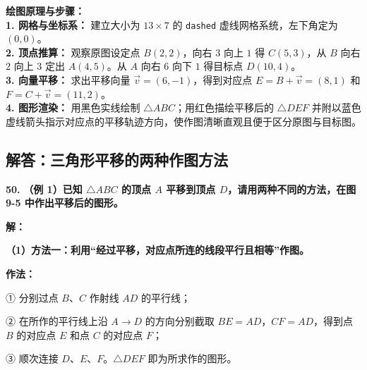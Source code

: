 \vspace{0.4cm}
{\small\color{blue!70!black}
\textbf{绘图原理与步骤：}\\
\textbf{1. 网格与坐标系：} 建立大小为 $13 \times 7$ 的 \texttt{dashed} 虚线网格系统，左下角定为 $(0,0)$。\\
\textbf{2. 顶点推算：} 观察原图设定点 $B(2,2)$，向右 $3$ 向上 $1$ 得 $C(5,3)$，从 $B$ 向右 $2$ 向上 $3$ 定出 $A(4,5)$。从 $A$ 向右 $6$ 向下 $1$ 得目标点 $D(10,4)$。\\
\textbf{3. 向量平移：} 求出平移向量 $\vec{v} = (6, -1)$，得到对应点 $E = B + \vec{v} = (8,1)$ 和 $F = C + \vec{v} = (11,2)$。\\
\textbf{4. 图形渲染：} 用黑色实线绘制 $\triangle ABC$；用红色描绘平移后的 $\triangle DEF$ 并附以蓝色虚线箭头指示对应点的平移轨迹方向，使作图清晰直观且便于区分原图与目标图。
}

\newpage

\newpage

\subsection{解答：三角形平移的两种作图方法}

\vspace{0.6cm}

\textbf{\LARGE 50.} \textbf{（例 1）已知 $\triangle ABC$ 的顶点 $A$ 平移到顶点 $D$，请用两种不同的方法，在图 9-5 中作出平移后的图形。}

\vspace{0.4cm}
\textbf{解：}

\textbf{（1）方法一：利用“经过平移，对应点所连的线段平行且相等”作图。}

\textbf{作法：}

① 分别过点 $B$、$C$ 作射线 $AD$ 的平行线；

② 在所作的平行线上沿 $A \to D$ 的方向分别截取 $BE = AD$，$CF = AD$，得到点 $B$ 的对应点 $E$ 和点 $C$ 的对应点 $F$；

③ 顺次连接 $D$、$E$、$F$。$\triangle DEF$ 即为所求作的图形。

